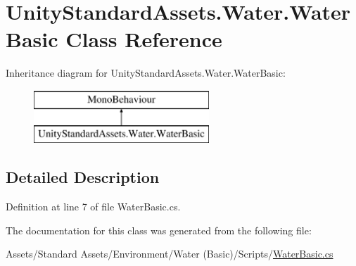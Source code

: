\hypertarget{class_unity_standard_assets_1_1_water_1_1_water_basic}{}\section{Unity\+Standard\+Assets.\+Water.\+Water\+Basic Class Reference}
\label{class_unity_standard_assets_1_1_water_1_1_water_basic}
Inheritance diagram for Unity\+Standard\+Assets.\+Water.\+Water\+Basic\+:\begin{figure}[H]
\begin{center}
\leavevmode
\includegraphics[height=2.000000cm]{class_unity_standard_assets_1_1_water_1_1_water_basic}
\end{center}
\end{figure}


\subsection{Detailed Description}


Definition at line 7 of file Water\+Basic.\+cs.



The documentation for this class was generated from the following file\+:\begin{DoxyCompactItemize}
\item 
Assets/\+Standard Assets/\+Environment/\+Water (\+Basic)/\+Scripts/\mbox{\hyperlink{_water_basic_8cs}{Water\+Basic.\+cs}}\end{DoxyCompactItemize}
